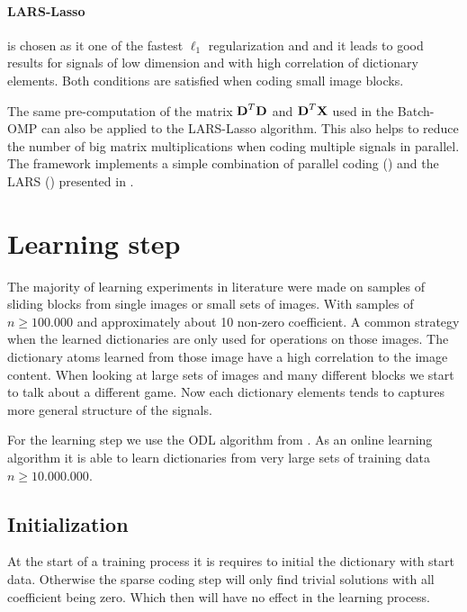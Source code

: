 
\paragraph{LARS-Lasso} is chosen as it one of the fastest $\ell_1$
regularization and and it leads to good results for signals of low dimension and
with high correlation of dictionary elements.\cite{Mairal2010} Both conditions
are satisfied when coding small image blocks.

The same pre-computation of the matrix $\boldsymbol{\mathrm{D}}^T\boldsymbol{\mathrm{D}}$ and
$\boldsymbol{\mathrm{D}}^T\boldsymbol{\mathrm{X}}$ used in the Batch-OMP can also be applied to the LARS-Lasso
algorithm. This also helps to reduce the number of big matrix multiplications
when coding multiple signals in parallel. The framework implements a simple
combination of parallel coding () and the
LARS () presented in .

\section{Learning step}
The majority of learning experiments in literature were made on
samples of sliding blocks from single images or small sets of images.
With samples of $n \ge 100.000$ and approximately about 10 non-zero coefficient.
A common strategy when the learned dictionaries are only used for operations on
those images. The dictionary atoms learned from those image have a high
correlation to the image content.  When looking at large sets of images and many
different blocks we start to talk about a different game. Now each dictionary
elements tends to captures more general structure of the signals.

For the learning step we use the ODL algorithm from . As
an online learning algorithm it is able to learn dictionaries from very large
sets of training data $n\ge 10.000.000$.


\subsection{Initialization}
At the start of a training process it is requires to initial the
dictionary with start data. Otherwise the sparse coding step will only find
trivial solutions with all coefficient being zero. Which then will have no
effect in the learning process.

